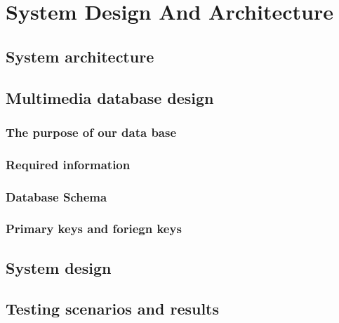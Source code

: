\chapter{System Design And Architecture}
\section{System architecture}





\section{Multimedia database design}
\subsection{The purpose of our data base}
\subsection{Required information}

\subsection{Database Schema}
\vskip 0.2in

\subsection{Primary keys and foriegn keys}


\section{System design}




\section{Testing scenarios and results}
